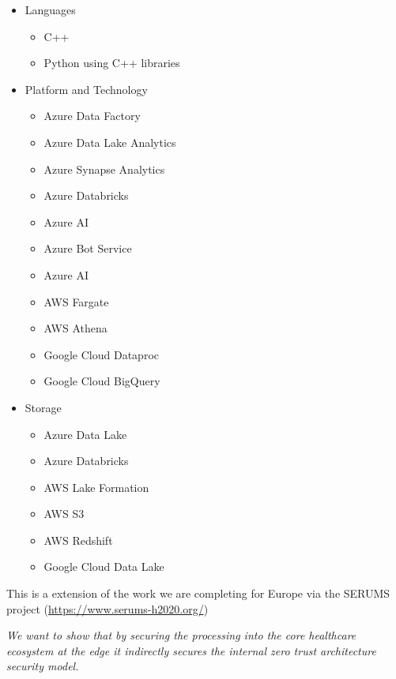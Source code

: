 \begin{Workpackage}{\thewpno}
\begin{Task}
\begin{itemize}
    \item Languages
        \begin{itemize}
            \item C++
            \item Python using C++ libraries
        \end{itemize}
    \item Platform and Technology
        \begin{itemize}
            \item Azure Data Factory
            \item Azure Data Lake Analytics
            \item Azure Synapse Analytics
            \item Azure Databricks
            \item Azure AI
            \item Azure Bot Service
            \item Azure AI
            \item AWS Fargate
            \item AWS Athena
            \item Google Cloud Dataproc
            \item Google Cloud BigQuery
        \end{itemize}
    \item Storage
        \begin{itemize}
            \item Azure Data Lake
            \item Azure Databricks
            \item AWS Lake Formation
            \item AWS S3
            \item AWS Redshift
            \item Google Cloud Data Lake
        \end{itemize}
\end{itemize}

This is a extension of the work we are completing for Europe via the SERUMS project (\url{https://www.serums-h2020.org/})


\emph{We want to show that by securing the processing into the core healthcare ecosystem at the edge it indirectly secures the internal zero trust architecture security model.}


\end{Task}
\end{Workpackage}
